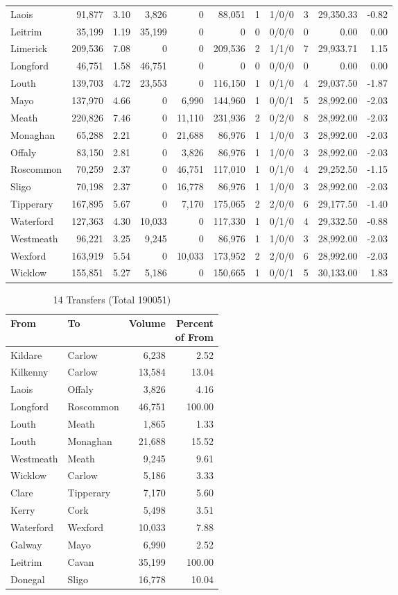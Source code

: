 \documentclass[a4paper]{article}
\begin{document}
\begin{longtable}{lrrrrrrlrrr}
Laois&91,877& 3.10&3,826&0&88,051&1&1/0/0&3&29,350.33&-0.82\\ 
Leitrim&35,199& 1.19&35,199&0&0&0&0/0/0&0& 0.00& 0.00\\ 
Limerick&209,536& 7.08&0&0&209,536&2&1/1/0&7&29,933.71& 1.15\\ 
Longford&46,751& 1.58&46,751&0&0&0&0/0/0&0& 0.00& 0.00\\ 
Louth&139,703& 4.72&23,553&0&116,150&1&0/1/0&4&29,037.50&-1.87\\ 
Mayo&137,970& 4.66&0&6,990&144,960&1&0/0/1&5&28,992.00&-2.03\\ 
Meath&220,826& 7.46&0&11,110&231,936&2&0/2/0&8&28,992.00&-2.03\\ 
Monaghan&65,288& 2.21&0&21,688&86,976&1&1/0/0&3&28,992.00&-2.03\\ 
Offaly&83,150& 2.81&0&3,826&86,976&1&1/0/0&3&28,992.00&-2.03\\ 
Roscommon&70,259& 2.37&0&46,751&117,010&1&0/1/0&4&29,252.50&-1.15\\ 
Sligo&70,198& 2.37&0&16,778&86,976&1&1/0/0&3&28,992.00&-2.03\\ 
Tipperary&167,895& 5.67&0&7,170&175,065&2&2/0/0&6&29,177.50&-1.40\\ 
Waterford&127,363& 4.30&10,033&0&117,330&1&0/1/0&4&29,332.50&-0.88\\ 
Westmeath&96,221& 3.25&9,245&0&86,976&1&1/0/0&3&28,992.00&-2.03\\ 
Wexford&163,919& 5.54&0&10,033&173,952&2&2/0/0&6&28,992.00&-2.03\\ 
Wicklow&155,851& 5.27&5,186&0&150,665&1&0/0/1&5&30,133.00& 1.83\\ 
\end{longtable}

\begin{table}[htbp]
\caption{14 Transfers (Total 190051)}
\centering
\begin{tabular}{llrr} \toprule
From &To &Volume &\shortstack{Percent\\of From} \\ \midrule
Kildare&Carlow&6,238& 2.52\\ 
Kilkenny&Carlow&13,584&13.04\\ 
Laois&Offaly&3,826& 4.16\\ 
Longford&Roscommon&46,751&100.00\\ 
Louth&Meath&1,865& 1.33\\ 
Louth&Monaghan&21,688&15.52\\ 
Westmeath&Meath&9,245& 9.61\\ 
Wicklow&Carlow&5,186& 3.33\\ 
Clare&Tipperary&7,170& 5.60\\ 
Kerry&Cork&5,498& 3.51\\ 
Waterford&Wexford&10,033& 7.88\\ 
Galway&Mayo&6,990& 2.52\\ 
Leitrim&Cavan&35,199&100.00\\ 
Donegal&Sligo&16,778&10.04\\ 
\bottomrule
\end{tabular}
\end{table}
\end{document}
